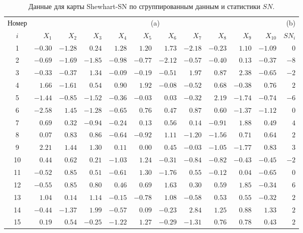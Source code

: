 \begin{table}[!ht]
	\centering
	\caption{Данные для карты Shewhart-SN по сгруппированным данным и статистики \(SN\).}
	\label{tab:4.6}
	\footnotesize
	\setlength{\tabcolsep}{4pt}%
	\begin{tabular}{@{}crrrrrrrrrrr@{}}\toprule
		Номер & \multicolumn{10}{c}{(a)} & (b) \\
		\(i\) & \(X_1\) & \(X_2\) & \(X_3\) & \(X_4\) & \(X_5\) & \(X_6\) & \(X_7\) & \(X_8\) & \(X_9\) & \(X_{10}\) & \(SN_i\) \\ \midrule
		1 & \(-0.30\) & \(-1.28\) & \(0.24\) & \(1.28\) & \(1.20\) & \(1.73\) & \(-2.18\) & \(-0.23\) & \(1.10\) & \(-1.09\) & \(0\) \\
		2 & \(-0.69\) & \(-1.69\) & \(-1.85\) & \(-0.98\) & \(-0.77\) & \(-2.12\) & \(-0.57\) & \(-0.40\) & \(0.13\) & \(-0.37\) & \(-8\) \\
		3 & \(-0.33\) & \(-0.37\) & \(1.34\) & \(-0.09\) & \(-0.19\) & \(-0.51\) & \(1.97\) & \(0.87\) & \(2.38\) & \(-0.65\) & \(-2\) \\
		4 & \(1.66\) & \(-1.61\) & \(0.54\) & \(0.90\) & \(1.92\) & \(-0.08\) & \(-0.52\) & \(0.68\) & \(-0.38\) & \(0.76\) & \(2\) \\
		5 & \(-1.44\) & \(-0.85\) & \(-1.52\) & \(-0.36\) & \(-0.03\) & \(0.03\) & \(-0.32\) & \(2.19\) & \(-1.74\) & \(-0.74\) & \(-6\) \\
		6 & \(-2.58\) & \(1.45\) & \(-1.28\) & \(-0.65\) & \(0.76\) & \(0.47\) & \(0.87\) & \(0.60\) & \(-1.37\) & \(-1.12\) & \(0\) \\
		7 & \(0.69\) & \(0.32\) & \(-0.94\) & \(-0.24\) & \(0.13\) & \(0.56\) & \(0.14\) & \(-0.91\) & \(1.88\) & \(0.49\) & \(4\) \\
		8 & \(0.07\) & \(0.83\) & \(0.86\) & \(-0.64\) & \(-0.92\) & \(1.11\) & \(-1.20\) & \(-1.56\) & \(0.71\) & \(0.64\) & \(2\) \\
		9 & \(2.21\) & \(1.44\) & \(1.30\) & \(0.11\) & \(0.00\) & \(0.45\) & \(-0.03\) & \(-1.05\) & \(-1.77\) & \(0.83\) & \(3\) \\
		10 & \(0.44\) & \(0.62\) & \(0.21\) & \(-1.03\) & \(1.24\) & \(-0.31\) & \(-0.84\) & \(-0.82\) & \(-0.43\) & \(-0.45\) & \(-2\) \\
		11 & \(-0.52\) & \(0.85\) & \(0.51\) & \(-0.61\) & \(1.30\) & \(-1.76\) & \(0.55\) & \(-0.12\) & \(0.04\) & \(-0.65\) & \(0\) \\
		12 & \(-0.55\) & \(0.85\) & \(0.80\) & \(0.46\) & \(0.69\) & \(1.63\) & \(0.30\) & \(0.59\) & \(1.85\) & \(-0.34\) & \(6\) \\
		13 & \(1.04\) & \(0.14\) & \(1.14\) & \(-0.15\) & \(-0.78\) & \(1.08\) & \(-0.58\) & \(0.53\) & \(0.55\) & \(-0.32\) & \(2\) \\
		14 & \(-0.44\) & \(-1.37\) & \(1.99\) & \(-0.57\) & \(0.09\) & \(-0.23\) & \(2.84\) & \(1.25\) & \(0.88\) & \(1.33\) & \(2\) \\
		15 & \(0.19\) & \(0.54\) & \(-0.25\) & \(-1.22\) & \(1.27\) & \(-0.29\) & \(-1.31\) & \(0.76\) & \(0.78\) & \(0.43\) & \(2\) \\ \bottomrule
	\end{tabular}
\end{table}

